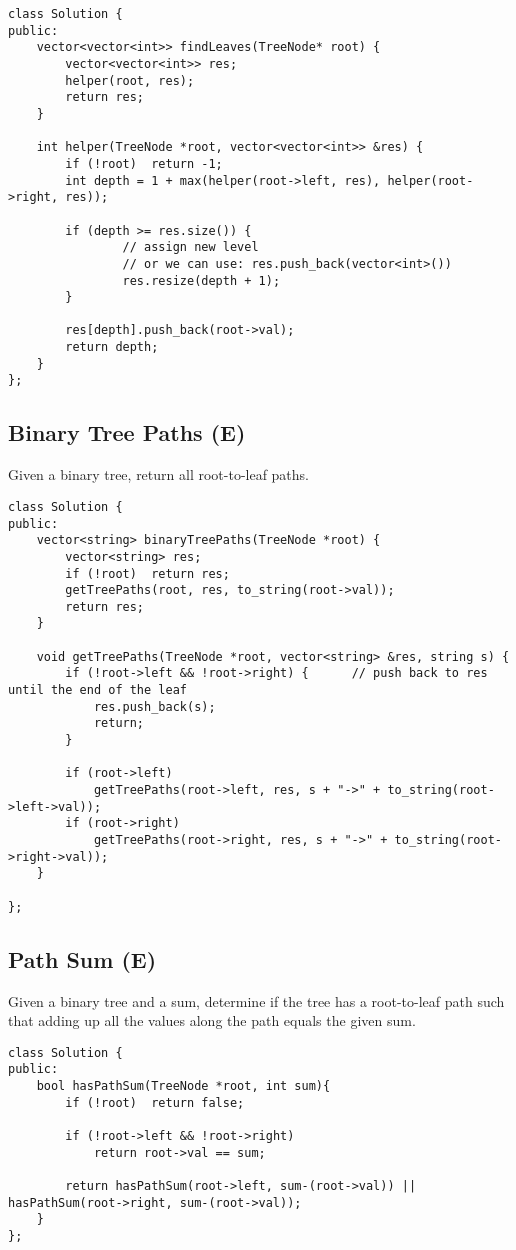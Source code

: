 \begin{lstlisting}
class Solution {
public:
    vector<vector<int>> findLeaves(TreeNode* root) {
        vector<vector<int>> res;
        helper(root, res);
        return res;
    }
    
    int helper(TreeNode *root, vector<vector<int>> &res) {
        if (!root)  return -1;
        int depth = 1 + max(helper(root->left, res), helper(root->right, res));
        
        if (depth >= res.size()) {
                // assign new level
                // or we can use: res.push_back(vector<int>())
        		res.resize(depth + 1);
        }
        
        res[depth].push_back(root->val);
        return depth;
    }
};
\end{lstlisting}


\subsection{Binary Tree Paths (E)}
Given a binary tree, return all root-to-leaf paths. \\

\begin{lstlisting}
class Solution {
public:
    vector<string> binaryTreePaths(TreeNode *root) {
        vector<string> res;
        if (!root)  return res;
        getTreePaths(root, res, to_string(root->val));
        return res;
    }
    
    void getTreePaths(TreeNode *root, vector<string> &res, string s) {
        if (!root->left && !root->right) {      // push back to res until the end of the leaf
            res.push_back(s);
            return;
        }
        
        if (root->left)
            getTreePaths(root->left, res, s + "->" + to_string(root->left->val));
        if (root->right)
            getTreePaths(root->right, res, s + "->" + to_string(root->right->val));
    }
    
};
\end{lstlisting}


\subsection{Path Sum (E)}
Given a binary tree and a sum, determine if the tree has a root-to-leaf path such that adding up all the values along the path equals the given sum. \\

\begin{lstlisting}
class Solution {
public:
    bool hasPathSum(TreeNode *root, int sum){
        if (!root)  return false;
        
        if (!root->left && !root->right)
            return root->val == sum;
            
        return hasPathSum(root->left, sum-(root->val)) || hasPathSum(root->right, sum-(root->val));
    }
};
\end{lstlisting}



